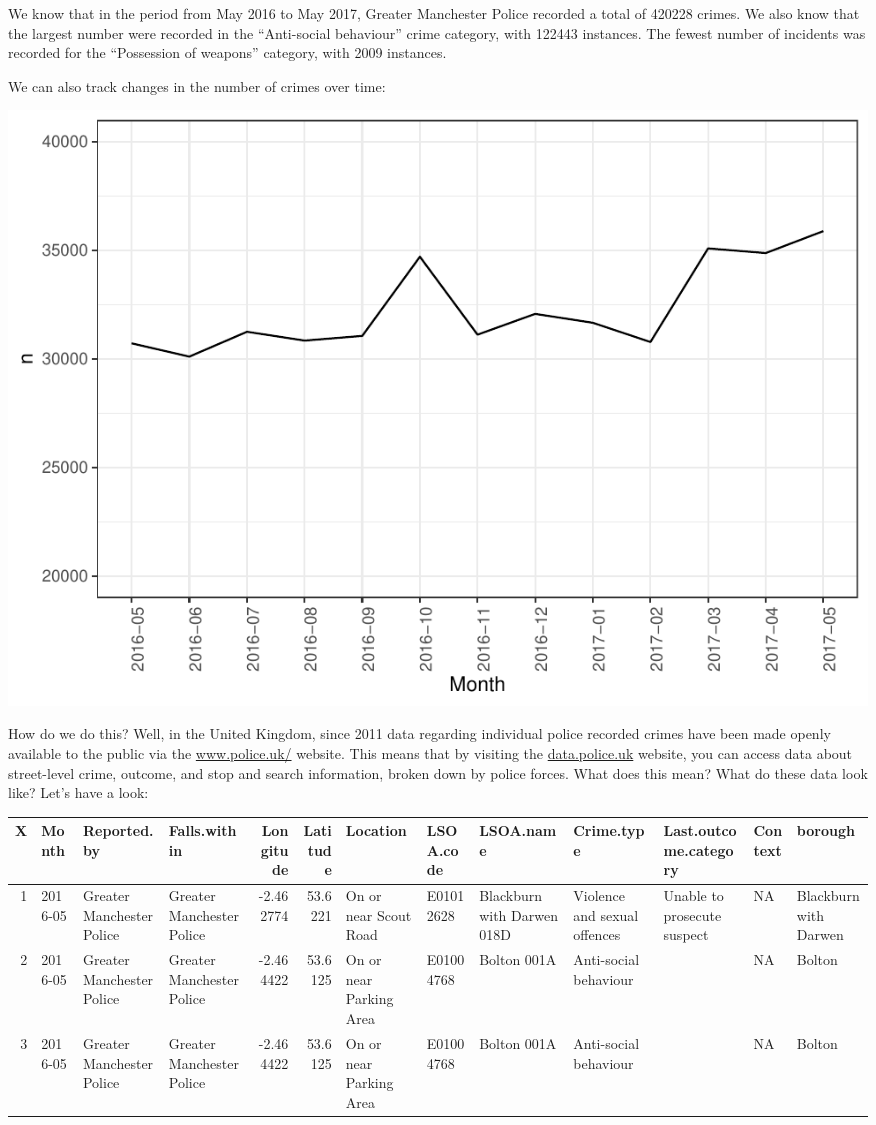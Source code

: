 \documentclass[
]{book}
\begin{document}
We know that in the period from May 2016 to May 2017, Greater Manchester Police recorded a total of 420228 crimes. We also know that the largest number were recorded in the ``Anti-social behaviour'' crime category, with 122443 instances. The fewest number of incidents was recorded for the ``Possession of weapons'' category, with 2009 instances.

We can also track changes in the number of crimes over time:

\includegraphics{bookdown-demo_files/figure-latex/unnamed-chunk-6-1.pdf}

How do we do this? Well, in the United Kingdom, since 2011 data regarding individual police recorded crimes have been made openly available to the public via the \href{https://www.police.uk/}{www.police.uk/} website. This means that by visiting the \href{https://data.police.uk/}{data.police.uk} website, you can access data about street-level crime, outcome, and stop and search information, broken down by police forces. What does this mean? What do these data look like? Let's have a look:

\begin{tabular}{r|l|l|l|r|r|l|l|l|l|l|l|l}
\hline
X & Month & Reported.by & Falls.within & Longitude & Latitude & Location & LSOA.code & LSOA.name & Crime.type & Last.outcome.category & Context & borough\\
\hline
1 & 2016-05 & Greater Manchester Police & Greater Manchester Police & -2.462774 & 53.6221 & On or near Scout Road & E01012628 & Blackburn with Darwen 018D & Violence and sexual offences & Unable to prosecute suspect & NA & Blackburn with Darwen\\
\hline
2 & 2016-05 & Greater Manchester Police & Greater Manchester Police & -2.464422 & 53.6125 & On or near Parking Area & E01004768 & Bolton 001A & Anti-social behaviour &  & NA & Bolton\\
\hline
3 & 2016-05 & Greater Manchester Police & Greater Manchester Police & -2.464422 & 53.6125 & On or near Parking Area & E01004768 & Bolton 001A & Anti-social behaviour &  & NA & Bolton\\
\hline
\end{tabular}
\end{document}
